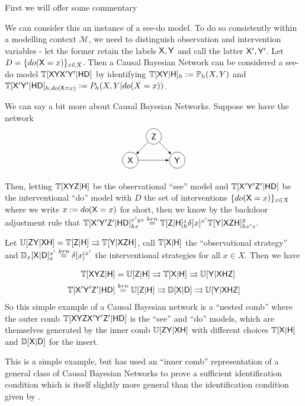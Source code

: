 First we will offer some commentary



We can consider this an instance of a see-do model. To do so consistently within a modelling context $\mathscr{M}$, we need to distinguish observation and intervention variables - let the former retain the labels $\mathsf{X},\mathsf{Y}$ and call the latter $\mathsf{X}',\mathsf{Y}'$. Let $D=\{do(\mathsf{X}=x)\}_{x\in X}$. Then a Causal Bayesian Network can be considered a see-do model $\mathbb{T}[\mathsf{XYX'Y'}|\mathsf{HD}]$ by identifying $\mathbb{T}[\mathsf{XY}|\mathsf{H}]_h := \mathbb{P}_h(X,Y)$ and $\mathbb{T}[\mathsf{X'Y'}|\mathsf{HD}]_{h,do(\mathsf{X}=x)}:={P}_h(X,Y|do(X=x))$.


We can say a bit more about Causal Bayesian Networks. Suppose we have the network
\begin{align*}
\begin{tikzpicture}
    \path (0,0) node[draw,circle] (X) {$\RV{X}$}
    ++ (1,1) node[draw,circle] (Z) {$\RV{Z}$}
    ++ (1,-1) node[draw, circle] (Y) {$\RV{Y}$};
    \draw[-latex] (X)--(Y);
    \draw[-latex] (Z) -- (Y);
    \draw[-latex] (Z) -- (X);
\end{tikzpicture}
\end{align*}

Then, letting $\mathbb{T}[\mathsf{XYZ}|\mathsf{H}]$ be the observational ``see'' model and $\mathbb{T}[\mathsf{X'Y'Z'}|\mathsf{HD}]$ be the interventional ``do'' model with $D$ the set of interventions $\{do(\mathsf{X}=x)\}_{x\in X}$ where we write $x:=do(\mathsf{X}=x)$ for short, then we know by the backdoor adjustment rule that $\mathbb{T}[\mathsf{X'Y'Z'}|\mathsf{HD}]_{hx}^{x'yz} \overset{krn}{=} \mathbb{T}[\mathsf{Z}|\mathsf{H}]_h^z \delta[x]^{x'} \mathbb{T}[\mathsf{Y}|\mathsf{XZH}]_{hx'z}^y$. 

Let $\mathbb{U}[\mathsf{ZY}|\mathsf{XH}] = \mathbb{T}[\mathsf{Z}|\mathsf{H}]\rightrightarrows \mathbb{T}[\mathsf{Y}|\mathsf{XZH}]$, call $\mathbb{T}[\mathsf{X}|\mathsf{H}]$ the ``observational strategy'' and $\mathbb{D}_x[\mathsf{X}|\mathsf{D}]_x^{x'} \overset{krn}{=} \delta[x]^{x'}$ the interventional strategies for all $x\in X$. Then we have

\begin{align}
    \mathbb{T}[\mathsf{XYZ}|\mathsf{H}] &= \mathbb{U}[\mathsf{Z}|\mathsf{H}]\rightrightarrows \mathbb{T}[\mathsf{X}|\mathsf{H}] \rightrightarrows \mathbb{U}[\mathsf{Y}|\mathsf{XHZ}]\\
    \mathbb{T}[\mathsf{X'Y'Z'}|\mathsf{HD}] &\overset{krn}{=} \mathbb{U}[\mathsf{Z}|\mathsf{H}]\rightrightarrows \mathbb{D}[\mathsf{X}|\mathsf{D}] \rightrightarrows \mathbb{U}[\mathsf{Y}|\mathsf{XHZ}]
\end{align}
So this simple example of a Causal Bayesian network is a ``nested comb'' where the outer comb $\mathbb{T}[\mathsf{XYZX'Y'Z'}|\mathsf{HD}]$ is the ``see'' and ``do'' models, which are themselves generated by the inner comb $\mathbb{U}[\mathsf{ZY}|\mathsf{XH}]$ with different choices $ \mathbb{T}[\mathsf{X}|\mathsf{H}]$ and $\mathbb{D}[\mathsf{X}|\mathsf{D}]$ for the insert.

This is a simple example, but \citet{jacobs_causal_2019} has used an ``inner comb'' representation of a general class of Causal Bayesian Networks to prove a sufficient identification condition which is itself slightly more general than the identification condition given by \citet{tian2002general}.
